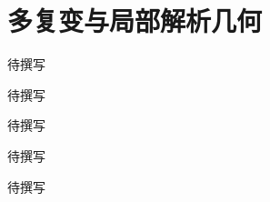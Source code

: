 
% 
% 

\chapter{多复变与局部解析几何}
\label{g4:ch:14}

\begin{chapterabstract}
待撰写
\end{chapterabstract}

\begin{learninggoals}
待撰写
\end{learninggoals}

待撰写







\begin{chaptersummary}
待撰写
\end{chaptersummary}

\BookExercises
待撰写
